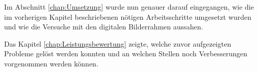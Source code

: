 \begin{flushleft}
\newpage
Im Abschnitt \ref{chap:Umsetzung} wurde nun genauer darauf eingegangen, wie die im vorherigen Kapitel beschriebenen nötigen Arbeitsschritte umgesetzt wurden und wie die Versuche mit den digitalen Bilderrahmen aussahen.
\newline

Das Kapitel \ref{chap:Leistungsbewertung} zeigte, welche zuvor aufgezeigten Probleme gelöst werden konnten und an welchen Stellen noch Verbesserungen vorgenommen werden können.
\end{flushleft}


